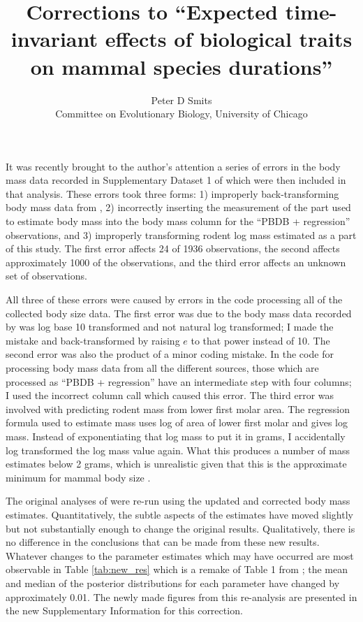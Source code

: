 \documentclass{article}
\title{Corrections to ``Expected time-invariant effects of biological traits on mammal species durations''}
\author{Peter D Smits\\Committee on Evolutionary Biology, University of Chicago}
\begin{document}
\maketitle

It was recently brought to the author's attention a series of errors in the body mass data recorded in Supplementary Dataset 1 of \citep{Smits2015} which were then included in that analysis. These errors took three forms: 1) improperly back-transforming body mass data from \citet{Smith2004}, 2) incorrectly inserting the measurement of the part used to estimate body mass into the body mass column for the ``PBDB + regression'' observations, and 3) improperly transforming rodent log mass estimated as a part of this study. The first error affects 24 of 1936 observations, the second affects approximately 1000 of the observations, and the third error affects an unknown set of observations.

All three of these errors were caused by errors in the code processing all of the collected body size data. The first error was due to the body mass data recorded by \citet{Smith2004} was log base 10 transformed and not natural log transformed; I made the mistake and back-transformed by raising \(e\) to that power instead of 10. The second error was also the product of a minor coding mistake. In the code for processing body mass data from all the different sources, those which are processed as ``PBDB + regression'' have an intermediate step with four columns; I used the incorrect column call which caused this error. The third error was involved with predicting rodent mass from lower first molar area. The regression formula used to estimate mass uses log of area of lower first molar and gives log mass. Instead of exponentiating that log mass to put it in grams, I accidentally log transformed the log mass value again. What this produces a number of mass estimates below 2 grams, which is unrealistic given that this is the approximate minimum for mammal body size \citep{Smith2004,Smith2011f}. 

The original analyses of \citep{Smits2015} were re-run using the updated and corrected body mass estimates. Quantitatively, the subtle aspects of the estimates have moved slightly but not substantially enough to change the original results. Qualitatively, there is no difference in the conclusions that can be made from these new results. Whatever changes to the parameter estimates which may have occurred are most observable in Table \ref{tab:new_res} which is a remake of Table 1 from \citet{Smits2015}; the mean and median of the posterior distributions for each parameter have changed by approximately 0.01. The newly made figures from this re-analysis are presented in the new Supplementary Information for this correction.
\end{document}
